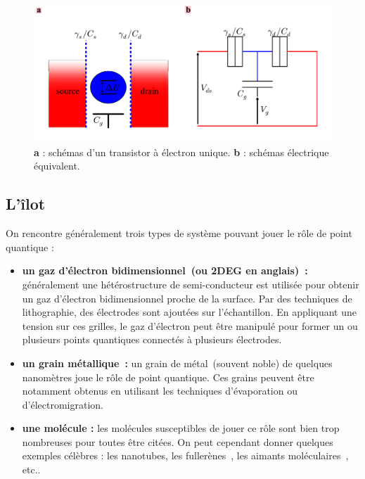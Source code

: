 \begin{figure}
\includegraphics[scale=0.45]{Annexe2/figure1/figure1.pdf} 
\caption{\textbf{a} : schémas d'un transistor à électron unique. \textbf{b} : schémas électrique équivalent.}
\label{description_systeme}
\end{figure}



\subsection{L'\^ilot}
On rencontre généralement trois types de système pouvant jouer le rôle de point quantique :
\begin{itemize}
\item \textbf{un gaz d'électron bidimensionnel~(ou 2DEG en anglais)~\cite{Goldhaber-Gordon1998}:} généralement une hétérostructure de semi-conducteur est utilisée pour obtenir un gaz d'électron bidimensionnel proche de la surface. Par des techniques de lithographie, des électrodes sont ajoutées sur l'échantillon. En appliquant une tension sur ces grilles, le gaz d'électron peut \^etre manipulé pour former un ou plusieurs points quantiques connectés à plusieurs électrodes.
\item \textbf{un grain métallique~\cite{Deshmukh2002}:} un grain de métal~(souvent noble) de quelques nanomètres joue le rôle de point quantique. Ces grains peuvent \^etre notamment obtenus en utilisant les techniques d'évaporation ou d'électromigration.
\item \textbf{une molécule \cite{Reed1997,Park2000}:} les molécules susceptibles de jouer ce r\^ole sont bien trop nombreuses pour toutes \^etre citées. On peut cependant donner quelques exemples célèbres : les nanotubes, les fullerènes~\cite{Park2000}, les aimants moléculaires~\cite{Heersche2006}, etc.. \newline
\end{itemize}

